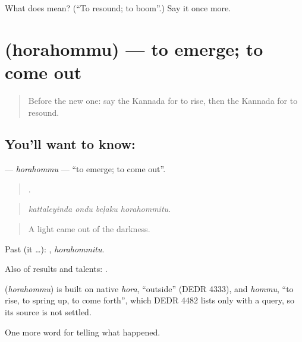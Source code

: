 \begin{tcolorbox}[breakable,colback=teal!4,colframe=teal!35!black,title={Before you move on}]
What does  mean? (\textquotedblleft{}To resound; to boom\textquotedblright{}.) Say it once more.
\end{tcolorbox}
\section[\texorpdfstring{\kn{ಹೊರಹೊಮ್ಮು} (horahommu)}{ಹೊರಹೊಮ್ಮು (horahommu)}]{ (horahommu) — to emerge; to come out}

\label{lesson:KA-C363-horahommu}



\begin{quote}
Before the new one: say the Kannada for to rise, then the Kannada for to resound.
\end{quote}

\subsection*{You'll want to know: }
\textbf{} — \emph{horahommu} — \textquotedblleft{}to emerge; to come out\textquotedblright{}.

\begin{quote}
   .
\end{quote}

\begin{quote}
\emph{kattaleyinda ondu beḷaku horahommitu.}
\end{quote}

\begin{quote}
A light came out of the darkness.
\end{quote}

Past (it …): , \emph{horahommitu}.

Also of results and talents:   .

\begin{cousinweb}
\textbf{} (\emph{horahommu}) is built on native \emph{hora}, \textquotedblleft{}outside\textquotedblright{} (DEDR 4333), and \emph{hommu}, \textquotedblleft{}to rise, to spring up, to come forth\textquotedblright{}, which DEDR 4482 lists only with a query, so its source is not settled.
\end{cousinweb}

\begin{grammarlens}[title={What you've built}]
One more word for telling what happened.
\end{grammarlens}

